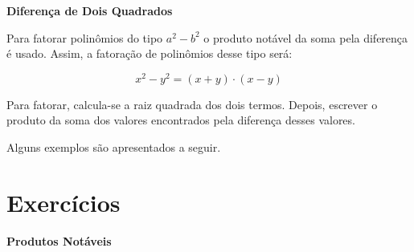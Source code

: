         \begin{texample}
        \centering
        \end{texample}

    \noindent
	\textbf{Diferença de Dois Quadrados}
	
	Para fatorar polinômios do tipo $a^2 - b^2$ o produto notável da soma pela diferença é usado. Assim, a fatoração de polinômios desse tipo será:
	
	\[
	x^2 - y^2 = (x + y)\cdot(x - y)
	\]
	
	Para fatorar, calcula-se a raiz quadrada dos dois termos. Depois, escrever o produto da soma dos valores encontrados pela diferença desses valores.
	
	Alguns exemplos são apresentados a seguir.

        \begin{texample}
        \centering
        \end{texample}
        
	\section{Exercícios}

    \noindent
	\textbf{Produtos Notáveis}
	
